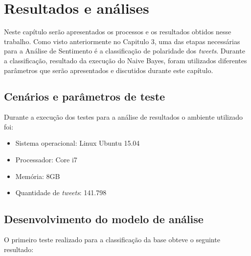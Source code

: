 \chapter{Resultados e análises}\label{cap:resultados}

Neste capítulo serão apresentados os processos e os resultados obtidos nesse trabalho. Como visto anteriormente no Capitulo 3,  uma das etapas
necessárias para a Análise de Sentimento é a classificação de polaridade dos \textit{tweets}. Durante a classificação, resultado da execução do Naive Bayes, foram utilizados diferentes parâmetros que serão apresentados e discutidos durante este capítulo.

\section{Cenários e parâmetros de teste}\label{sec:cenarios}
Durante a execução dos testes para a análise de resultados o ambiente utilizado foi:
\begin{itemize}
	\item Sistema operacional: Linux Ubuntu 15.04
	\item Processador: Core i7
	\item Memória: 8GB
	\item Quantidade de \textit{tweets}: 141.798
\end{itemize}


\section{Desenvolvimento do modelo de análise}\label{sec:desenv-moda}
O primeiro teste realizado para a classificação da base obteve o seguinte resultado:
\begin{table}[]
	\caption{1º teste}
	\label{teste-1}
\end{table}

